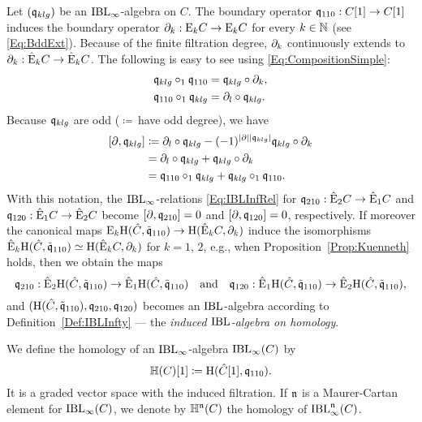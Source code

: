 \documentclass[\MainFolder/Text.tex]{subfiles}
\begin{document}
Let $(\mathfrak{q}_{klg})$ be an $\mathrm{IBL}_\infty$-algebra on $C$. The boundary operator $\mathfrak{q}_{110}: C[1] \rightarrow C[1]$ induces the boundary operator $\partial_k : \mathrm{E}_k C \rightarrow \mathrm{E}_k C$ for every $k\in \mathbb{N}$ (see \eqref{Eq:BddExt}). Because of the finite filtration degree, $\partial_k$ continuously extends to $\partial_k: \hat{\mathrm{E}}_k C \rightarrow \hat{\mathrm{E}}_k C$.
The following is easy to see using \eqref{Eq:CompositionSimple}:
\[\begin{aligned}
 \mathfrak{q}_{klg} \circ_1 \mathfrak{q}_{110} &= \mathfrak{q}_{klg} \circ \partial_k, \\
 \mathfrak{q}_{110} \circ_1 \mathfrak{q}_{klg} &= \partial_l \circ \mathfrak{q}_{klg}.
\end{aligned}\]
Because $\mathfrak{q}_{klg}$ are odd ($\coloneqq$\,have odd degree), we have
\[ \begin{aligned}
  [\Bdd,\OPQ_{klg}] &\coloneqq \Bdd_l \circ \OPQ_{klg} - (-1)^{\Abs{\Bdd}\Abs{\OPQ_{klg}}} \OPQ_{klg}\circ \Bdd_k \\
   &= \Bdd_l \circ \OPQ_{klg} + \OPQ_{klg}\circ \Bdd_k \\
   &= \OPQ_{110}\circ_1 \OPQ_{klg} + \OPQ_{klg}\circ_1 \OPQ_{110}.
  \end{aligned}\]
With this notation, the $\mathrm{IBL}_\infty$-relations \eqref{Eq:IBLInfRel} for 
$\mathfrak{q}_{210}: \hat{\mathrm{E}}_2 C \rightarrow \hat{\mathrm{E}}_1 C$ and $\mathfrak{q}_{120}: \hat{\mathrm{E}}_1 C \rightarrow \hat{\mathrm{E}}_2 C$ become $[\partial,\mathfrak{q}_{210}] = 0$ and $[\partial,\mathfrak{q}_{120}] = 0$, respectively. If moreover the canonical maps $\mathrm{E}_k \mathrm{H}(\hat{C},\tilde{\mathfrak{q}}_{110}) \rightarrow \mathrm{H}(\hat{\mathrm{E}}_k C, \partial_k)$ induce the isomorphisms $\hat{\mathrm{E}}_k \mathrm{H}(\hat{C},\tilde{\mathfrak{q}}_{110})  \simeq \mathrm{H}(\hat{\mathrm{E}}_k C, \partial_k)$ for $k=1$, $2$, e.g., when Proposition~\ref{Prop:Kuenneth} holds, then we obtain the maps
\[ \mathfrak{q}_{210}: \hat{\mathrm{E}}_2\mathrm{H}(\hat{C},\tilde{\mathfrak{q}}_{110})  \rightarrow \hat{\mathrm{E}}_1\mathrm{H}(\hat{C},\tilde{\mathfrak{q}}_{110}) \quad \text{and}\quad \mathfrak{q}_{120}: \hat{\mathrm{E}}_1\mathrm{H}(\hat{C},\tilde{\mathfrak{q}}_{110})  \rightarrow \hat{\mathrm{E}}_2\mathrm{H}(\hat{C},\tilde{\mathfrak{q}}_{110}), \]
and $(\mathrm{H}(\hat{C},\tilde{\mathfrak{q}}_{110}),\mathfrak{q}_{210},\mathfrak{q}_{120})$ becomes an $\mathrm{IBL}$-algebra according to Definition~\ref{Def:IBLInfty} --- the \emph{induced $\mathrm{IBL}$-algebra on homology}.

\begin{Definition}[Homology]\label{Def:HomIBL}
We define the homology of an $\mathrm{IBL}_\infty$-algebra $\mathrm{IBL}_\infty(C)$ by
\[ \mathbb{H}(C)[1] \coloneqq \mathrm{H}(\hat{C}[1], \mathfrak{q}_{110}). \]
It is a graded vector space with the induced filtration. If $\mathfrak{n}$ is a Maurer-Cartan element for $\mathrm{IBL}_\infty(C)$, we denote by $\mathbb{H}^{\mathfrak{n}}(C)$ the homology of $\mathrm{IBL}_\infty^{\mathfrak{n}}(C)$.
\end{Definition}
\end{document}
